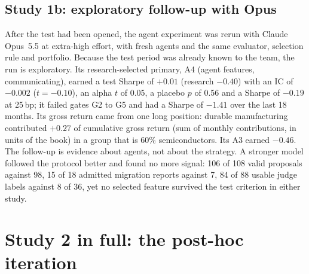 \subsection*{Study 1b: exploratory follow-up with Opus}\label{app:opus}
After the test had been opened, the agent experiment was rerun with Claude Opus~5.5 at extra-high effort, with fresh agents and the same evaluator, selection rule and portfolio. Because the test period was already known to the team, the run is exploratory. Its research-selected primary, A4 (agent features, communicating), earned a test Sharpe of $+0.01$ (research $-0.40$) with an IC of $-0.002$ ($t=-0.10$), an alpha $t$ of 0.05, a placebo $p$ of 0.56 and a Sharpe of $-0.19$ at 25\,bp; it failed gates G2 to G5 and had a Sharpe of $-1.41$ over the last 18 months. %
Its gross return came from one long position: durable manufacturing contributed $+0.27$ of cumulative gross return (sum of monthly contributions, in units of the book) in a group that is 60\% semiconductors. %
Its A3 earned $-0.46$. %
The follow-up is evidence about agents, not about the strategy. A stronger model followed the protocol better and found no more signal: 106 of 108 valid proposals against 98, 15 of 18 admitted migration reports against 7, 84 of 88 usable judge labels against 8 of 36, %
yet no selected feature survived the test criterion in either study. %



\section{Study 2 in full: the post-hoc iteration}\label{app:study2}
